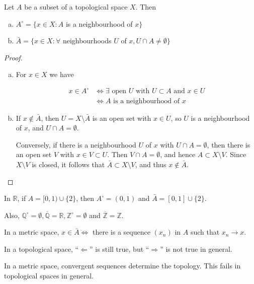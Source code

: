 \documentclass[a4paper]{article}
\begin{document}
\begin{proposition}
    Let $A$ be a subset of a topological space $X$. Then
    \begin{enumerate}[(a)]
        \item $A^{\circ}=\{x \in X: A$ is a neighbourhood of $x\}$
        \item $\bar{A}=\{x \in X: \forall $ neighbourhoods $U$ of $x, U \cap A \neq \emptyset\}$
    \end{enumerate}
\end{proposition}
\begin{proof}
    \begin{enumerate}[(a)]
        \item For $x \in X$ we have

        $$
        \begin{aligned}
        x \in A^{\circ} & \Longleftrightarrow \exists \text { open } U \text { with } U \subset A \text { and } x \in U \\
        & \Longleftrightarrow A \text { is a neighbourhood of } x
        \end{aligned}
        $$
        
        \item If $x \notin \bar{A}$, then $U=X \setminus \bar{A}$ is an open set with $x \in U$, so $U$ is a neighbourhood of $x$, and $U \cap A=\emptyset$.
        
        Conversely, if there is a neighbourhood $U$ of $x$ with $U \cap A=\emptyset$, then there is an open set $V$ with $x \in V \subset U$. Then $V \cap A=\emptyset$, and hence $A \subset X \setminus V$. Since $X \setminus V$ is closed, it follows that $\bar{A} \subset X \setminus V$, and thus $x \notin \bar{A}$.\qedhere
    \end{enumerate}
\end{proof}

\begin{example}
    In $\mathbb{R}$, if $A=[0,1) \cup\{2\}$, then $A^{\circ}=(0,1)$ and $\bar{A}=[0,1] \cup\{2\}$.

    Also, $\mathbb{Q}^{\circ}=\emptyset, \overline{\mathbb{Q}}=\mathbb{R}, \mathbb{Z}^{\circ}=\emptyset$ and $\overline{\mathbb{Z}}=\mathbb{Z}$.
\end{example}

\begin{note}
    In a metric space, $x \in \bar{A} \Longleftrightarrow$ there is a sequence $\left(x_{n}\right)$ in $A$ such that $x_{n} \rightarrow x$.

In a topological space, ``$\Longleftarrow $'' is still true, but ``$\Longrightarrow $'' is not true in general.

In a metric space, convergent sequences determine the topology. This fails in topological spaces in general.
\end{note}
\end{document}
